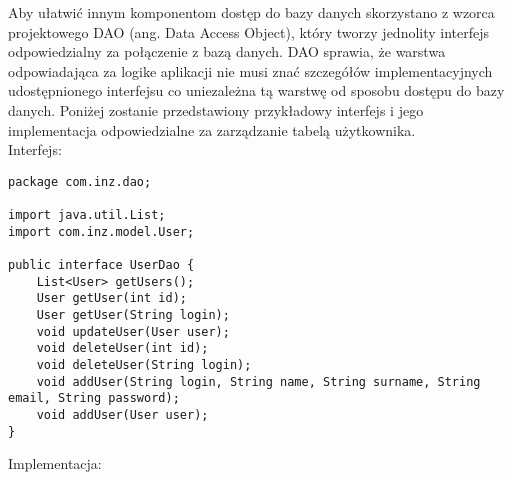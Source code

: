 Aby ułatwić innym komponentom dostęp do bazy danych skorzystano z wzorca projektowego DAO (ang. Data Access Object), który tworzy jednolity interfejs odpowiedzialny za połączenie z bazą danych. DAO sprawia, że warstwa odpowiadająca za logike aplikacji nie musi znać szczegółów implementacyjnych udostępnionego interfejsu co uniezależna tą warstwę od sposobu dostępu do bazy danych. Poniżej zostanie przedstawiony przykładowy interfejs i jego implementacja odpowiedzialne za zarządzanie tabelą użytkownika.\\
Interfejs:
\begin{lstlisting}
package com.inz.dao;

import java.util.List;
import com.inz.model.User;

public interface UserDao {
	List<User> getUsers();
	User getUser(int id);
	User getUser(String login);
	void updateUser(User user);
	void deleteUser(int id);
	void deleteUser(String login);
	void addUser(String login, String name, String surname, String email, String password);
	void addUser(User user);
}
\end{lstlisting}
Implementacja:
